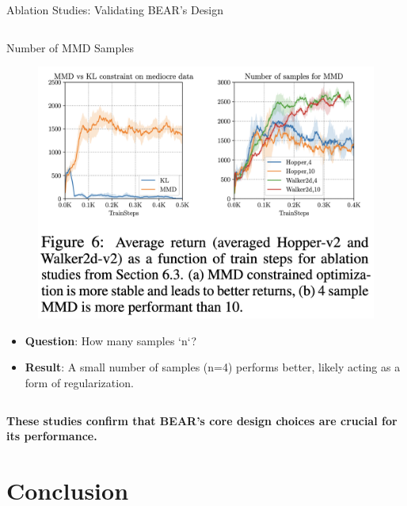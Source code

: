 \documentclass[11pt]{beamer}
\newcommand{\tb}[1]{\textbf{#1}}
\begin{document}
\begin{frame}{Ablation Studies: Validating BEAR's Design}
\begin{columns}[T]
\begin{column}{.5\textwidth}
\begin{block}{Number of MMD Samples}
\begin{figure}
                 \includegraphics[width=\textwidth]{Figure6.png}
                 \end{figure}
                 \begin{itemize}
                     \item \tb{Question}: How many samples `n`?
                     \item \tb{Result}: A small number of samples (n=4) performs better, likely acting as a form of regularization.
                 \end{itemize}
            \end{block}
        \end{column}
    \end{columns}

    \begin{center}
        \tb{These studies confirm that BEAR's core design choices are crucial for its performance.}
    \end{center}
\end{frame}

\section{Conclusion}
\end{document}

